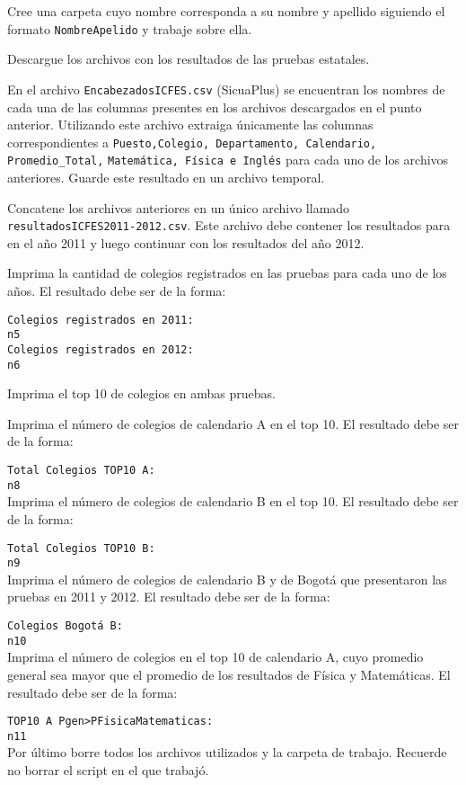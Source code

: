 \documentclass[letterpaper,10pt,onecolumn]{exam}
\begin{document}
\begin{questions}
	\question[5] Cree una carpeta cuyo nombre corresponda a su nombre y apellido siguiendo el formato \verb|NombreApelido| y trabaje sobre ella.
	
	\question[5] Descargue los archivos con los resultados de las pruebas estatales.
	
	\question[10] En el archivo \verb|EncabezadosICFES.csv| (SicuaPlus) se encuentran los nombres de cada una de las columnas presentes en los archivos descargados en el punto anterior. Utilizando este archivo extraiga únicamente las columnas correspondientes a \verb|Puesto,Colegio, Departamento, Calendario, Promedio_Total,| \verb|Matemática, Física e Inglés| para cada uno de los archivos anteriores. Guarde este resultado en un archivo temporal.
	
	\question[10] Concatene los archivos anteriores en un único archivo llamado \verb|resultadosICFES2011-2012.csv|. Este archivo debe contener los resultados para en el año 2011 y luego continuar con los resultados del año 2012.
	
	\question[10] Imprima la cantidad de colegios registrados en las pruebas para cada uno de los años. El resultado debe ser de la forma:
	
	\verb|Colegios registrados en 2011:|\\
	\verb|n5|\\
	\verb|Colegios registrados en 2012:|\\
	\verb|n6|
	
	\question[10] Imprima el top 10 de colegios en ambas pruebas.
	
	\newpage
	
	\question[10] Imprima el número de colegios de calendario A en el top 10. El resultado debe ser de la forma:
	
	\verb|Total Colegios TOP10 A:|\\
	\verb|n8|\\
	
	\question[10] Imprima el número de colegios de calendario B en el top 10. El resultado debe ser de la forma:
	
	\verb|Total Colegios TOP10 B:|\\
	\verb|n9|\\
	
	\question[10] Imprima el número de colegios de calendario B y de Bogotá que presentaron las pruebas en 2011 y 2012. El resultado debe ser de la forma:
	
	\verb|Colegios Bogotá B:|\\
	\verb|n10|\\
	
	\question[10] Imprima el número de colegios en el top 10 de calendario A, cuyo promedio general sea mayor que el promedio de los resultados de Física y Matemáticas. El resultado debe ser de la forma:
	
	\verb|TOP10 A Pgen>PFisicaMatematicas:|\\
	\verb|n11|\\
	
	\question[10] Por último borre todos los archivos utilizados y la carpeta de trabajo. Recuerde no borrar el script en el que trabajó.	
	
	
\end{questions}	
\end{document}
